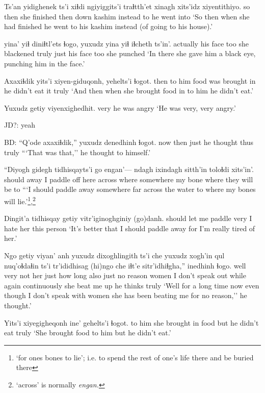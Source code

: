\documentclass[12pt]{article}
\begin{document}
\gll Ts'an yidighenek ts'i xiɬdi {ngiyiggits'i} traɬtth'et xinagh xits'idz  xiyentithiyo. 
{so then} {she finished} {} then down kashim instead to      {he went into}
\glt `So then when she had finished he went to his kashim instead (of going to his house).' 
\glend

 yina' yiɬ diniɬtl'ets {ɬogo}, yuxudz yina yiɬ iɬcheth ts'in'.
actually {his face} too {she blackened} truly just {his face} too {she punched} {}
\glt `In there she gave him a black eye, punching him in the face.' 
\glend

\gll Axaxiɬdik yits'i xiyen-giduqonh, {yehelts'i} ɬogot. 
then {to him} {food was brought in} {he didn't eat it} truly
\glt `And then when she brought food in to him he didn't eat.' 
\glend

\gll Yuxudz getiy viyenxighedhit. 
{} very {he was angry}
\glt `He was very, very angry.' 
\glend

JD?:  yeah

BD:
\gll ``Q'ode axaxiɬdik,'' yuxudz denedhinh {ɬogot}. 
now  {then} {just} {he thought thus} truly
\glt ```That was that,'' he thought to himself.' 
\glend

\gll ``Diyogh gidegh {tidhisqayts'i} go engan'--- ndagh ixindagh sitth'in toloɬdi xits'in'. 
should  away {I paddle off}  here across where somewhere {my bone} {where they will be} to
\glt ```I should paddle away somewhere far across the water to where my bones will lie.'\footnote{`for ones bones to lie'; i.e. to spend the rest of one's life there and be buried there},\footnote{`across' is normally \em engan.}
\glend

\gll Dingit'a tidhisqay getiy vitr'iginoghginiy (go)danh. 
should  {let me paddle} very {I hate her} {this person}
\glt `It's better that I should paddle away for I'm really tired of her.' 
\glend

\gll Ngo getiy viyan' anh yuxudz dixoghlingith ts'i che yuxudz {xogh'in qul} nuq'oɬdaɬin ts'i {tr'ididhisag} (hi)ngo che iɬt'e sitr'idhiɬgha,'' inedhinh {ɬogo.}		
well very not her just {how long} {} also just {no reason}  women {} {I don't speak out} while again continuously {she beat me up} {he thinks} truly
\glt `Well for a long time now even though I don't speak with women she has been beating me for no reason,'' he thought.' 
\glend

\gll Yits'i xiyegigheqonh ine' {gehelts'i} ɬogot. 
{to him} {she brought in food} but {he didn't eat} truly
\glt `She brought food to him but he didn't eat.' 
\glend
\end{document}
